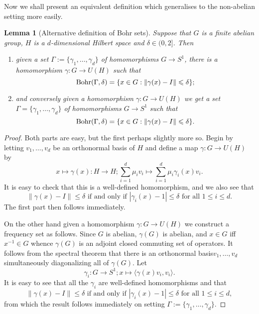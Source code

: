 \documentclass[12pt]{amsart}
\numberwithin{equation}{section}
\theoremstyle{plain}
\newtheorem{lemma}[subsection]{Lemma}
\theoremstyle{definition}
\renewcommand{\leq}{\leqslant}
\providecommand{\Bohr}{\mathop{\rm Bohr}\nolimits}
\begin{document}
Now we shall present an equivalent definition which generalises to the non-abelian setting more easily.
\begin{lemma}[Alternative definition of Bohr sets]
Suppose that $G$ is a finite abelian group, $H$ is a $d$-dimensional Hilbert space and $\delta \in (0,2]$.  Then
\begin{enumerate}
\item given a set $\Gamma:=\{\gamma_1,\dots,\gamma_d\}$ of homomorphisms $G \rightarrow S^1$, there is a homomorphism $\gamma:G \rightarrow U(H)$ such that
\begin{equation*}
\Bohr(\Gamma,\delta)=\{x \in G: \|\gamma(x) -I\|\leq \delta\};
\end{equation*}
\item and conversely given a homomorphism $\gamma:G \rightarrow U(H)$ we get a set $\Gamma=\{\gamma_1,\dots,\gamma_d\}$ of homomorphisms $G \rightarrow S^1$ such that
\begin{equation*}
\Bohr(\Gamma,\delta)=\{x \in G:  \|\gamma(x) -I\| \leq \delta\}.
\end{equation*}
\end{enumerate}
\end{lemma}
\begin{proof}
Both parts are easy, but the first perhaps slightly more so.  Begin by letting $v_1,\dots,v_d$ be an orthonormal basis of $H$ and define a map $\gamma:G \rightarrow U(H)$ by
\begin{equation*}
x \mapsto \gamma(x):H \rightarrow H; \sum_{i=1}^d{\mu_iv_i} \mapsto \sum_{i=1}^d{\mu_i\gamma_i(x)v_i}.
\end{equation*}
It is easy to check that this is a well-defined homomorphism, and we also see that
\begin{equation*}
\|\gamma(x)-I\| \leq \delta \textrm{ if and only if } |\gamma_i(x) - 1| \leq \delta \textrm{ for all }1 \leq i \leq d.
\end{equation*}
The first part then follows immediately.

On the other hand given a homomorphism $\gamma:G \rightarrow U(H)$ we construct a frequency set as follows.  Since $G$ is abelian, $\gamma(G)$ is abelian, and $x \in G$ iff $x^{-1} \in G$ whence $\gamma(G)$ is an adjoint closed commuting set of operators.  It follows from the spectral theorem that there is an orthonormal basis$v_1,\dots,v_d$ simultaneously diagonalizing all of $\gamma(G)$.  Let
\begin{equation*}
\gamma_i:G \rightarrow S^1; x \mapsto \langle \gamma(x)v_i,v_i\rangle.
\end{equation*}
It is easy to see that all the $\gamma_i$ are well-defined homomorphisms and that
\begin{equation*}
\|\gamma(x)-I\|\leq \delta \textrm{ if and only if } |\gamma_i(x) - 1| \leq \delta \textrm{ for all }1 \leq i \leq d,
\end{equation*}
from which the result follows immediately on setting $\Gamma:=\{\gamma_1,\dots,\gamma_d\}$.
\end{proof}
\end{document}
